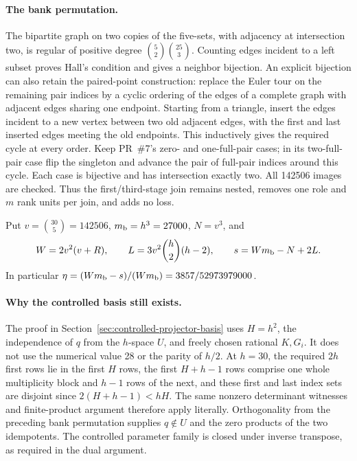 \paragraph{The bank permutation.}
The bipartite graph on two copies of the five-sets, with adjacency at
intersection two, is regular of positive degree
$\binom52\binom{25}{3}$. Counting edges incident to a left subset proves
Hall's condition and gives a neighbor bijection. An explicit bijection
can also retain the paired-point construction: replace the Euler tour
on the remaining pair indices by a cyclic ordering of the edges of a
complete graph with adjacent edges sharing one endpoint. Starting from
a triangle, insert the edges incident to a new vertex between two old
adjacent edges, with the first and last inserted edges meeting the old
endpoints. This inductively gives the required cycle at every order.
Keep PR~\#7's zero- and one-full-pair cases; in its two-full-pair case
flip the singleton and advance the pair of full-pair indices around
this cycle. Each case is bijective and has intersection exactly two.
All 142506 images are checked. Thus the first/third-stage join remains
nested, removes one role and $m$ rank units per join, and adds no loss.

Put $v=\binom{30}{5}=142506$, $m_{\rm b}=h^3=27000$, $N=v^3$, and
\[
 W=2v^2(v+R),\qquad L=3v^2\binom h2(h-2),\qquad s=Wm_{\rm b}-N+2L.
\]
In particular $\eta=(Wm_{\rm b}-s)/(Wm_{\rm b})=3857/52973979000$.

\paragraph{Why the controlled basis still exists.}
The proof in Section~\ref{sec:controlled-projector-basis} uses $H=h^2$,
the independence of $q$ from the $h$-space $U$, and freely chosen
rational $K,G_i$. It does not use the numerical value 28 or the parity
of $h/2$. At $h=30$, the required $2h$ first rows lie in the first
$H$ rows, the first $H+h-1$ rows comprise one whole multiplicity block
and $h-1$ rows of the next, and these first and last index sets are
disjoint since $2(H+h-1)<hH$. The same nonzero determinant witnesses
and finite-product argument therefore apply literally. Orthogonality
from the preceding bank permutation supplies $q\notin U$ and the
zero products of the two idempotents. The controlled parameter family
is closed under inverse transpose, as required in the dual argument.


